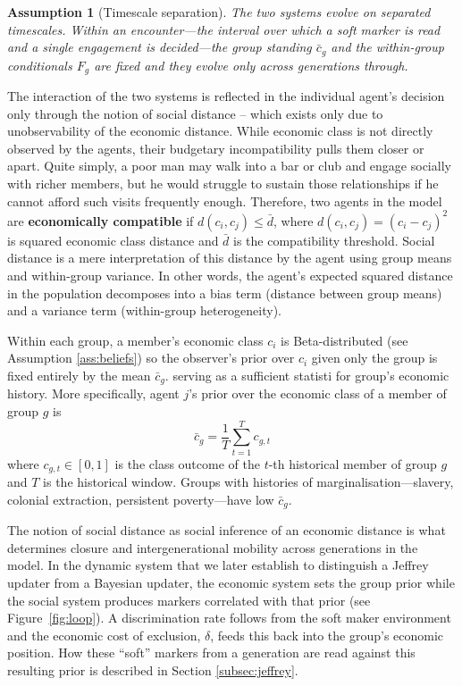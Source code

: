 \documentclass[pdflatex,sn-basic]{sn-jnl}
\theoremstyle{thmstyleone}
\newtheorem{assumption}{Assumption}
\numberwithin{proposition}{subsection}
\begin{document}
\begin{assumption}[Timescale separation]
\label{ass:timescale}
The two systems evolve on separated timescales. Within an
encounter---the interval over which a soft marker is read and a single
engagement is decided---the group standing $\bar{c}_g$ and the
within-group conditionals $F_g$ are fixed and they evolve only across
generations through.
\end{assumption}

The interaction of the two systems is reflected in the individual agent's decision only through the notion of social distance -- which exists only due to unobservability of the economic distance. While economic class is not directly observed by the agents, their budgetary incompatibility pulls them closer or apart. Quite simply, a poor man may walk into a bar or club and engage socially with richer members, but he would struggle to sustain those relationships if he cannot afford such visits frequently enough. Therefore, two agents in the model are \textbf{economically compatible} if
$d(c_i, c_j) \leq \bar{d}$, where $d(c_i, c_j) = (c_i - c_j)^2$ is
squared economic class distance and $\bar{d}$ is the compatibility threshold. Social distance is a mere interpretation of this distance by the agent using group means and within-group variance. In other words, the agent's expected squared distance in the population decomposes into a bias term (distance between group means) and
a variance term (within-group heterogeneity). 

Within each group, a member's economic class $c_i$ is Beta-distributed (see Assumption \ref{ass:beliefs}) so the observer's prior over $c_i$ given only the group is fixed entirely by the mean $\bar{c}_g$.  serving as a sufficient statisti for group's economic history.  More specifically, agent $j$'s prior over the economic class of a member of group $g$ is
\begin{equation}
  \bar{c}_g = \frac{1}{T} \sum_{t=1}^{T} c_{g,t}
  \label{eq:prior}
\end{equation}
where $c_{g,t} \in [0,1]$ is the class outcome of the $t$-th
historical member of group $g$ and $T$ is the historical window. Groups with histories of
marginalisation---slavery, colonial extraction, persistent
poverty---have low $\bar{c}_g$.

The notion of social distance as social inference of an economic distance is what determines closure and intergenerational mobility across generations in the model. In the dynamic system that we later establish to distinguish a Jeffrey updater from a Bayesian updater, the economic system sets the group prior while the social system produces markers correlated with that prior (see Figure~\ref{fig:loop}). A discrimination rate follows from the soft maker environment and the economic cost of exclusion, $\delta$, feeds this back into the group's economic position. 
How these  ``soft'' markers from a generation are read against this resulting prior is described in Section \ref{subsec:jeffrey}.
\end{document}
